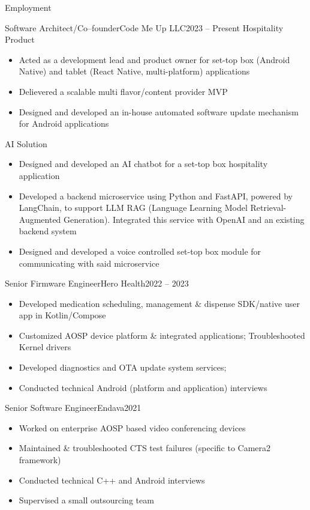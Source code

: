 \documentclass[]{mcdowellcv}
\begin{document}
\begin{cvsection}{Employment}
\begin{cvsubsection}{Software Architect/Co--founder}{Code Me Up LLC}{2023 -- Present}
			Hospitality Product
			\begin{itemize}
				\item Acted as a development lead and product owner for set-top box (Android Native) and tablet (React Native, multi-platform) applications
				\item Delievered a scalable multi flavor/content provider MVP
				\item Designed and developed an in-house automated software update mechanism for Android applications \newline
			\end{itemize}

			AI Solution
			\begin{itemize}
				\item Designed and developed an AI chatbot for a set-top box hospitality application
				\item Developed a backend microservice using Python and FastAPI, powered by LangChain, to support LLM RAG (Language Learning Model Retrieval-Augmented Generation). Integrated this service with OpenAI and an existing backend system
				\item Designed and developed a voice controlled set-top box module for communicating with said microservice
			\end{itemize}
			
		\end{cvsubsection}

		\begin{cvsubsection}{Senior Firmware Engineer}{Hero Health}{2022 -- 2023}
			\begin{itemize}
				\item Developed medication scheduling, management \& dispense SDK/native user app in Kotlin/Compose
				\item Customized AOSP device platform \& integrated applications; Troubleshooted Kernel drivers
				\item Developed diagnostics and OTA update system services;
				\item Conducted technical Android (platform and application) interviews
			\end{itemize}
		\end{cvsubsection}

		\begin{cvsubsection}{Senior Software Engineer}{Endava}{2021}
			\begin{itemize}
				\item Worked on enterprise AOSP based video conferencing devices
				\item Maintained \& troubleshooted CTS test failures (specific to Camera2 framework)
				\item Conducted technical C++ and Android interviews
				\item Supervised a small outsourcing team
			\end{itemize}
		\end{cvsubsection}


\end{cvsection}
\end{document}

